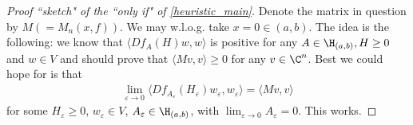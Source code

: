 \begin{proof}[Proof ``sketch" of the ``only if" of \ref{heuristic_main}]
	Denote the matrix in question by $M (= M_{n}(x, f))$. We may w.l.o.g. take $x = 0 \in (a, b)$. The idea is the following: we know that $\langle D f_{A} (H) w, w \rangle$ is positive for any $A \in \H_{(a, b)}, H \geq 0$ and $w \in V$ and should prove that $\langle M v, v \rangle \geq 0$ for any $v \in \C^{n}$. Best we could hope for is that
	\begin{align*}
		\lim_{\varepsilon \to 0} \langle D f_{A_{\varepsilon}} (H_{\varepsilon}) w_{\varepsilon}, w_{\varepsilon} \rangle = \langle M v, v \rangle
	\end{align*}
	for some $H_{\varepsilon} \geq 0$, $w_{\varepsilon} \in V$, $A_{\varepsilon} \in \H_{(a, b)}$, with $\lim_{\varepsilon \to 0} A_{\varepsilon} = 0$. This works.


\end{proof}
